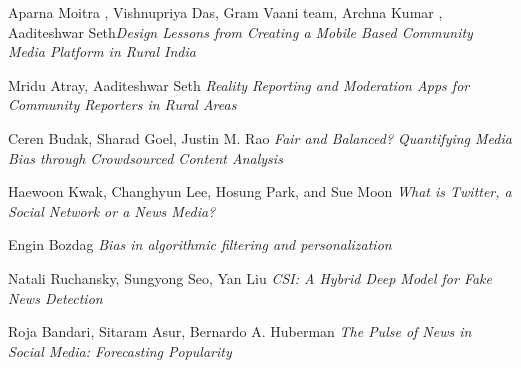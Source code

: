 \documentclass[11pt]{article}
\begin{document}
	\begin{thebibliography}{1}
	
    \bibitem{}
    
    {Aparna
Moitra , Vishnupriya Das, Gram Vaani team, Archna Kumar , Aaditeshwar Seth}\textit{Design Lessons from Creating a Mobile Based Community Media Platform in Rural India}

    \bibitem{}
    {Mridu Atray, Aaditeshwar Seth}
    \textit{Reality Reporting and Moderation Apps for Community Reporters in Rural Areas}

\bibitem{}
    {Ceren Budak,
Sharad Goel,
Justin M. Rao} \textit{ Fair and Balanced?
Quantifying Media Bias through
Crowdsourced Content Analysis}
    
    \bibitem{}
    Haewoon Kwak, Changhyun Lee, Hosung Park, and Sue Moon
    \textit{What is Twitter, a Social Network or a News Media?}
    
        \bibitem{}
    Engin Bozdag
    \textit{Bias in algorithmic filtering and personalization}

\bibitem{}
    Natali Ruchansky,
Sungyong Seo,
Yan Liu
    \textit{CSI: A Hybrid Deep Model for Fake News Detection}

\bibitem{}
Roja Bandari,
Sitaram Asur,
Bernardo A. Huberman
    \textit{The Pulse of News in Social Media: Forecasting Popularity}
	\end{thebibliography}
\end{document}
